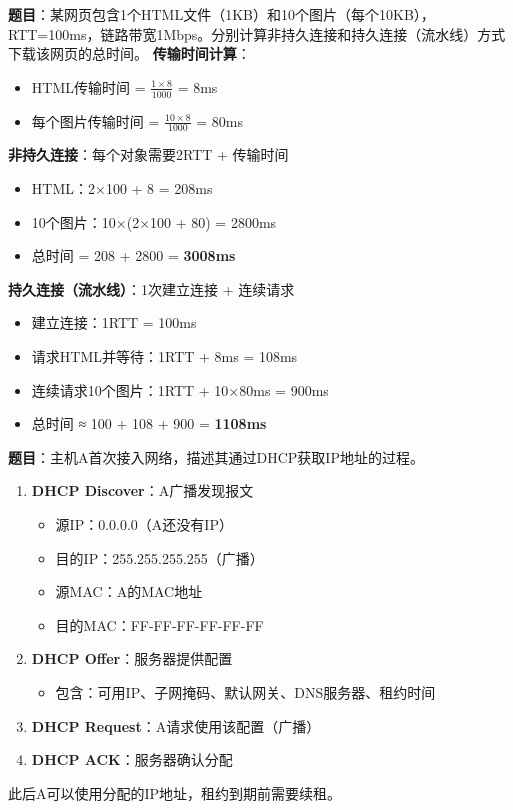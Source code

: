 \begin{examplebox}[例题6.6 HTTP持久连接]
\textbf{题目}：某网页包含1个HTML文件（1KB）和10个图片（每个10KB），RTT=100ms，链路带宽1Mbps。分别计算非持久连接和持久连接（流水线）方式下载该网页的总时间。
\tcblower
\textbf{传输时间计算}：
\begin{itemize}[itemsep=0pt]
    \item HTML传输时间 = $\frac{1\times8}{1000}$ = 8ms
    \item 每个图片传输时间 = $\frac{10\times8}{1000}$ = 80ms
\end{itemize}

\textbf{非持久连接}：每个对象需要2RTT + 传输时间
\begin{itemize}[itemsep=0pt]
    \item HTML：2×100 + 8 = 208ms
    \item 10个图片：10×(2×100 + 80) = 2800ms
    \item 总时间 = 208 + 2800 = \textbf{3008ms}
\end{itemize}

\textbf{持久连接（流水线）}：1次建立连接 + 连续请求
\begin{itemize}[itemsep=0pt]
    \item 建立连接：1RTT = 100ms
    \item 请求HTML并等待：1RTT + 8ms = 108ms
    \item 连续请求10个图片：1RTT + 10×80ms = 900ms
    \item 总时间 ≈ 100 + 108 + 900 = \textbf{1108ms}
\end{itemize}
\end{examplebox}

\begin{examplebox}[例题6.7 DHCP工作过程]
\textbf{题目}：主机A首次接入网络，描述其通过DHCP获取IP地址的过程。
\tcblower
\begin{enumerate}[itemsep=0pt]
    \item \textbf{DHCP Discover}：A广播发现报文
    \begin{itemize}[itemsep=0pt]
        \item 源IP：0.0.0.0（A还没有IP）
        \item 目的IP：255.255.255.255（广播）
        \item 源MAC：A的MAC地址
        \item 目的MAC：FF-FF-FF-FF-FF-FF
    \end{itemize}
    
    \item \textbf{DHCP Offer}：服务器提供配置
    \begin{itemize}[itemsep=0pt]
        \item 包含：可用IP、子网掩码、默认网关、DNS服务器、租约时间
    \end{itemize}
    
    \item \textbf{DHCP Request}：A请求使用该配置（广播）
    
    \item \textbf{DHCP ACK}：服务器确认分配
\end{enumerate}

此后A可以使用分配的IP地址，租约到期前需要续租。
\end{examplebox}

